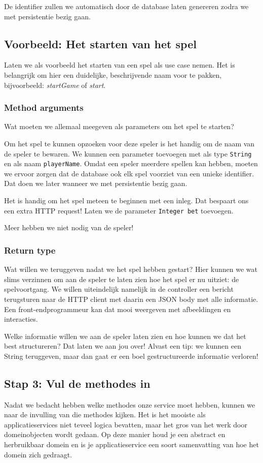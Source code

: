 De identifier zullen we automatisch door de database laten genereren
zodra we met persistentie bezig gaan.

\subsection{Voorbeeld: Het starten van het spel}
Laten we als voorbeeld het starten van een spel als use case nemen.
Het is belangrijk om hier een duidelijke, beschrijvende naam voor te pakken,
bijvoorbeeld: \textit{startGame} of \textit{start}.

\subsubsection{Method arguments}
Wat moeten we allemaal meegeven als parameters om het spel te starten?

Om het spel te kunnen opzoeken voor deze speler is het handig om de naam van de speler  
te bewaren. We kunnen een parameter toevoegen met als type \texttt{String} en 
als naam \texttt{playerName}. 
Omdat een speler meerdere spellen kan hebben, moeten we ervoor zorgen 
dat de database ook elk spel voorziet van een unieke identifier. 
Dat doen we later wanneer we met persistentie bezig gaan.

Het is handig om het spel meteen te beginnen met een inleg. Dat bespaart ons een
extra HTTP request! Laten we de parameter \texttt{Integer bet} toevoegen.

Meer hebben we niet nodig van de speler!

\subsubsection{Return type}
Wat willen we teruggeven nadat we het spel hebben gestart? 
Hier kunnen we wat slims verzinnen om aan de speler te laten zien hoe 
het spel er nu uitziet: de spelvoortgang. 
We willen uiteindelijk namelijk in de controller
een bericht terugsturen naar de HTTP client met daarin een JSON body 
met alle informatie. Een front-endprogrammeur kan dat mooi weergeven met
afbeeldingen en interacties.

Welke informatie willen we aan de speler laten zien
en hoe kunnen we dat het best structureren? Dat laten we aan jou over!
Alvast een tip: we kunnen een String teruggeven, 
maar dan gaat er een boel gestructureerde informatie verloren!

\subsection{Stap 3: Vul de methodes in}
Nadat we bedacht hebben welke methodes onze service moet hebben, 
kunnen we naar de invulling van die methodes kijken.
Het is het mooiste als applicatieservices niet teveel logica bevatten,
maar het gros van het werk door domeinobjecten wordt gedaan.
Op deze manier houd je een abstract en herbruikbaar domein en is je 
applicatieservice een soort samenvatting van hoe het domein zich gedraagt.

